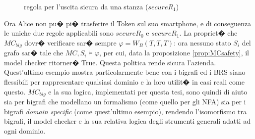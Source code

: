 \begin{figure}[!htbp]
\centering
{}
\caption{regola per l'uscita sicura da una stanza ($secureR_1$)\label{fig:secureLeaveRoom}}
\end{figure}




Ora Alice non pu� pi� trasferire il Token sul suo smartphone, e di conseguenza le uniche due regole applicabili sono $secureR_0$ e $secureR_1$. La propriet� che $MC_{big}$ dovr� verificare sar� sempre $\varphi = W_B(T,T,T)$: ora nessuno stato $S_i$ del grafo sar� tale che $MC,S_i \models \varphi$, per cui, data la proposizione \ref{prop:MCsafety}, il model checker ritorner� True. Questa politica rende sicura l'azienda.\\

Quest'ultimo esempio mostra particolarmente bene con i bigrafi ed i BRS siano flessibili per rappresentare qualsiasi dominio e la loro utilit� in casi reali come questo. $MC_{big}$ e la sua logica, implementati per questa tesi, sono quindi di aiuto sia per bigrafi che modellano un formalismo (come quello per gli NFA) sia per i bigrafi \emph{domain specific} (come quest'ultimo esempio), rendendo l'isomorfismo tra bigrafi, il model checker e la sua relativa logica degli strumenti generali adatti ad ogni dominio.







